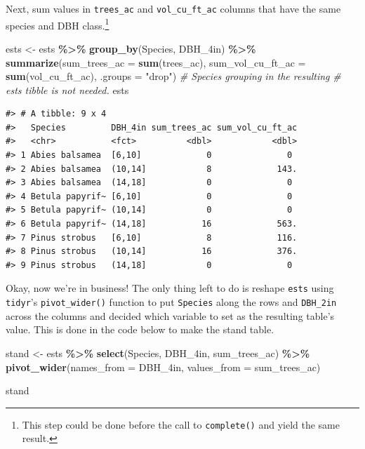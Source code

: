 \documentclass[
  11pt,
]{krantz}
\newenvironment{Shaded}{\begin{snugshade}}{\end{snugshade}}
\newcommand{\CommentTok}[1]{\textcolor[rgb]{0.56,0.35,0.01}{\textit{#1}}}
\newcommand{\DataTypeTok}[1]{\textcolor[rgb]{0.13,0.29,0.53}{#1}}
\newcommand{\KeywordTok}[1]{\textcolor[rgb]{0.13,0.29,0.53}{\textbf{#1}}}
\newcommand{\NormalTok}[1]{#1}
\newcommand{\OperatorTok}[1]{\textcolor[rgb]{0.81,0.36,0.00}{\textbf{#1}}}
\newcommand{\StringTok}[1]{\textcolor[rgb]{0.31,0.60,0.02}{#1}}
\theoremstyle{definition}
\theoremstyle{definition}
\theoremstyle{definition}
\theoremstyle{definition}
\theoremstyle{remark}
\begin{document}
Next, sum values in \texttt{trees\_ac} and \texttt{vol\_cu\_ft\_ac} columns that have the same species and DBH class.\footnote{This step could be done before the call to \texttt{complete()} and yield the same result.}

\begin{Shaded}
\begin{Highlighting}[]
\NormalTok{ests \textless{}{-}}\StringTok{ }\NormalTok{ests }\OperatorTok{\%\textgreater{}\%}\StringTok{ }\KeywordTok{group\_by}\NormalTok{(Species, DBH\_4in) }\OperatorTok{\%\textgreater{}\%}
\StringTok{  }\KeywordTok{summarize}\NormalTok{(}\DataTypeTok{sum\_trees\_ac =} \KeywordTok{sum}\NormalTok{(trees\_ac),}
            \DataTypeTok{sum\_vol\_cu\_ft\_ac =} \KeywordTok{sum}\NormalTok{(vol\_cu\_ft\_ac),}
            \DataTypeTok{.groups =} \StringTok{"drop"}\NormalTok{) }\CommentTok{\# Species grouping in the resulting}
                            \CommentTok{\# ests tibble is not needed.}
\NormalTok{ests}
\end{Highlighting}
\end{Shaded}

\begin{verbatim}
#> # A tibble: 9 x 4
#>   Species         DBH_4in sum_trees_ac sum_vol_cu_ft_ac
#>   <chr>           <fct>          <dbl>            <dbl>
#> 1 Abies balsamea  [6,10]             0               0 
#> 2 Abies balsamea  (10,14]            8             143.
#> 3 Abies balsamea  (14,18]            0               0 
#> 4 Betula papyrif~ [6,10]             0               0 
#> 5 Betula papyrif~ (10,14]            0               0 
#> 6 Betula papyrif~ (14,18]           16             563.
#> 7 Pinus strobus   [6,10]             8             116.
#> 8 Pinus strobus   (10,14]           16             376.
#> 9 Pinus strobus   (14,18]            0               0
\end{verbatim}

Okay, now we're in business! The only thing left to do is reshape \texttt{ests} using \texttt{tidyr}'s \texttt{pivot\_wider()} function to put \texttt{Species} along the rows and \texttt{DBH\_2in} across the columns and decided which variable to set as the resulting table's value. This is done in the code below to make the stand table.

\begin{Shaded}
\begin{Highlighting}[]
\NormalTok{stand \textless{}{-}}\StringTok{ }\NormalTok{ests }\OperatorTok{\%\textgreater{}\%}\StringTok{ }\KeywordTok{select}\NormalTok{(Species, DBH\_4in, sum\_trees\_ac) }\OperatorTok{\%\textgreater{}\%}
\StringTok{  }\KeywordTok{pivot\_wider}\NormalTok{(}\DataTypeTok{names\_from =}\NormalTok{ DBH\_4in, }\DataTypeTok{values\_from =}\NormalTok{ sum\_trees\_ac)}

\NormalTok{stand}
\end{Highlighting}
\end{Shaded}
\end{document}
